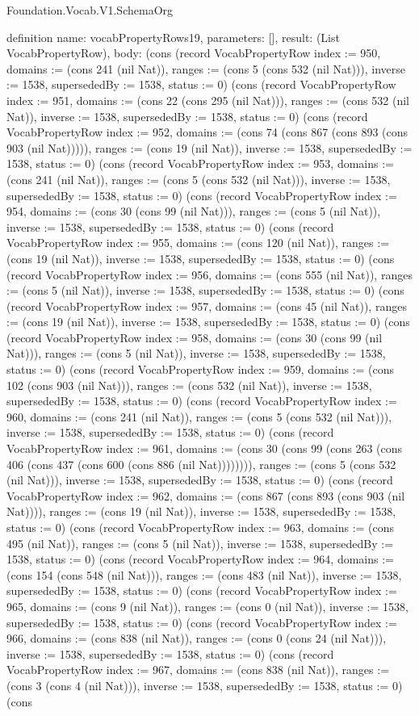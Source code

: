 \begin{lexlean}{Foundation.Vocab.V1.SchemaOrg}
\begin{semanticmodule}
definition{
  name: vocabPropertyRows19,
  parameters: [],
  result: (List VocabPropertyRow),
  body: (cons (record VocabPropertyRow {index := 950, domains := (cons 241 (nil Nat)), ranges := (cons 5 (cons 532 (nil Nat))), inverse := 1538, supersededBy := 1538, status := 0}) (cons (record VocabPropertyRow {index := 951, domains := (cons 22 (cons 295 (nil Nat))), ranges := (cons 532 (nil Nat)), inverse := 1538, supersededBy := 1538, status := 0}) (cons (record VocabPropertyRow {index := 952, domains := (cons 74 (cons 867 (cons 893 (cons 903 (nil Nat))))), ranges := (cons 19 (nil Nat)), inverse := 1538, supersededBy := 1538, status := 0}) (cons (record VocabPropertyRow {index := 953, domains := (cons 241 (nil Nat)), ranges := (cons 5 (cons 532 (nil Nat))), inverse := 1538, supersededBy := 1538, status := 0}) (cons (record VocabPropertyRow {index := 954, domains := (cons 30 (cons 99 (nil Nat))), ranges := (cons 5 (nil Nat)), inverse := 1538, supersededBy := 1538, status := 0}) (cons (record VocabPropertyRow {index := 955, domains := (cons 120 (nil Nat)), ranges := (cons 19 (nil Nat)), inverse := 1538, supersededBy := 1538, status := 0}) (cons (record VocabPropertyRow {index := 956, domains := (cons 555 (nil Nat)), ranges := (cons 5 (nil Nat)), inverse := 1538, supersededBy := 1538, status := 0}) (cons (record VocabPropertyRow {index := 957, domains := (cons 45 (nil Nat)), ranges := (cons 19 (nil Nat)), inverse := 1538, supersededBy := 1538, status := 0}) (cons (record VocabPropertyRow {index := 958, domains := (cons 30 (cons 99 (nil Nat))), ranges := (cons 5 (nil Nat)), inverse := 1538, supersededBy := 1538, status := 0}) (cons (record VocabPropertyRow {index := 959, domains := (cons 102 (cons 903 (nil Nat))), ranges := (cons 532 (nil Nat)), inverse := 1538, supersededBy := 1538, status := 0}) (cons (record VocabPropertyRow {index := 960, domains := (cons 241 (nil Nat)), ranges := (cons 5 (cons 532 (nil Nat))), inverse := 1538, supersededBy := 1538, status := 0}) (cons (record VocabPropertyRow {index := 961, domains := (cons 30 (cons 99 (cons 263 (cons 406 (cons 437 (cons 600 (cons 886 (nil Nat)))))))), ranges := (cons 5 (cons 532 (nil Nat))), inverse := 1538, supersededBy := 1538, status := 0}) (cons (record VocabPropertyRow {index := 962, domains := (cons 867 (cons 893 (cons 903 (nil Nat)))), ranges := (cons 19 (nil Nat)), inverse := 1538, supersededBy := 1538, status := 0}) (cons (record VocabPropertyRow {index := 963, domains := (cons 495 (nil Nat)), ranges := (cons 5 (nil Nat)), inverse := 1538, supersededBy := 1538, status := 0}) (cons (record VocabPropertyRow {index := 964, domains := (cons 154 (cons 548 (nil Nat))), ranges := (cons 483 (nil Nat)), inverse := 1538, supersededBy := 1538, status := 0}) (cons (record VocabPropertyRow {index := 965, domains := (cons 9 (nil Nat)), ranges := (cons 0 (nil Nat)), inverse := 1538, supersededBy := 1538, status := 0}) (cons (record VocabPropertyRow {index := 966, domains := (cons 838 (nil Nat)), ranges := (cons 0 (cons 24 (nil Nat))), inverse := 1538, supersededBy := 1538, status := 0}) (cons (record VocabPropertyRow {index := 967, domains := (cons 838 (nil Nat)), ranges := (cons 3 (cons 4 (nil Nat))), inverse := 1538, supersededBy := 1538, status := 0}) (cons }
\end{semanticmodule}
\end{lexlean}
